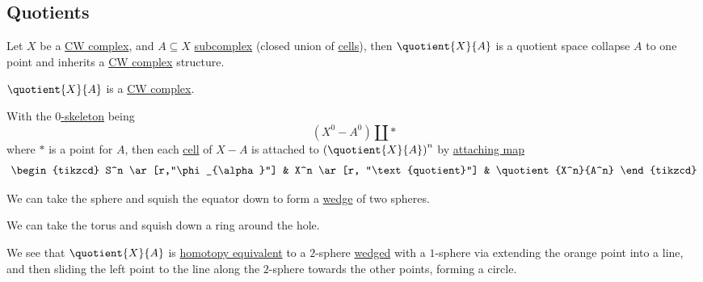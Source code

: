 \subsection{Quotients}\label{CW-complex-quotient}
Let \(X\) be a \hyperref[def:CW-Complex]{CW complex}, and \(A\subseteq X\) \hyperref[def:CW-subcomplex]{subcomplex} (closed union of \hyperref[def:cell]{cells}), then
\(\quotient{X}{A}\) is a quotient space collapse \(A\) to one point and inherits a \hyperref[def:CW-Complex]{CW complex} structure.
\begin{remark}
	\(\quotient{X}{A} \) is a \hyperref[def:CW-Complex]{CW complex}.
\end{remark}
\begin{explanation}
	With the \hyperref[def:skeleton]{\(0\)-skeleton} being
	\[
		(X^0 - A^0)\coprod \ast
	\]
	where \(\ast\) is a point for \(A\), then each \hyperref[def:cell]{cell} of \(X-A\) is attached to \(\left(\quotient{X}{A} \right)^n\)
	by \hyperref[def:attaching-map]{attaching map}
	\[
		\begin{tikzcd}
			S^n \ar[r,"\phi_{\alpha}"] & X^n \ar[r, "\text{quotient}"] & \quotient{X^n}{A^n}
		\end{tikzcd}
	\]
\end{explanation}

\begin{eg}
	We can take the sphere and squish the equator down to form a \hyperref[CW-complex-wedge-sum]{wedge} of two spheres.
	\begin{center}
	\end{center}
\end{eg}

\begin{eg}
	We can take the torus and squish down a ring around the hole.
	\begin{center}
	\end{center}
	We see that \(\quotient{X}{A}\) is \hyperref[def:homotopy-equivalence]{homotopy equivalent}
	to a \(2\)-sphere \hyperref[CW-complex-wedge-sum]{wedged} with a \(1\)-sphere via extending the orange point into a line, and then
	sliding the left point to the line along the \(2\)-sphere towards the other points, forming a circle.
\end{eg}
